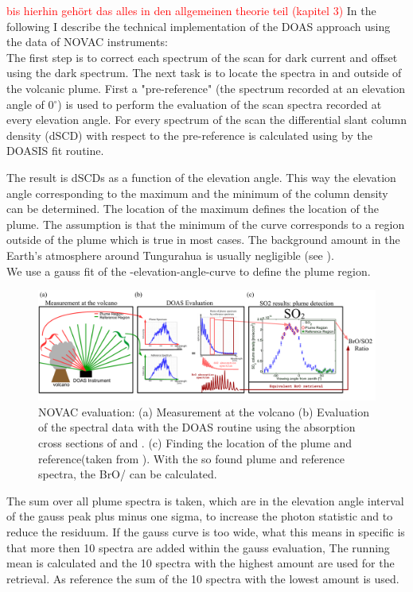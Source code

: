 \textcolor{red}{bis hierhin gehört das alles in den allgemeinen theorie teil (kapitel 3)}
%
In the following I describe the technical implementation of the DOAS approach using the data of NOVAC instruments:\\
%
The first step is to correct each spectrum of the scan for dark current and offset using the dark spectrum.
The next task is to locate the spectra in and outside of the volcanic plume.
First a "pre-reference" (the spectrum recorded at an elevation angle of  0$^{\circ} $) is used to perform the evaluation of the scan spectra recorded at every elevation angle.
For every spectrum of the scan the  differential slant column density (dSCD) with respect to the pre-reference is calculated using  by the DOASIS fit routine.

The result is  dSCDs as a function of the elevation angle. This way the elevation angle corresponding to the maximum and the minimum of the  column density can be determined. The location of the  maximum defines the location of the plume. The assumption is that the minimum of the  curve corresponds to a region outside of the plume which is true in most cases. The background  amount in the Earth's atmosphere around Tungurahua is usually negligible (see  ). \\
We use a gauss fit of the -elevation-angle-curve to define the plume region.
%
\begin{figure}
	\centering
	\includegraphics[width=1\linewidth]{Bilder/NOVAC_Eval}
	\caption{NOVAC evaluation: (a) Measurement at the volcano (b) Evaluation of the spectral data with the DOAS routine using the absorption cross sections of   and . (c) Finding the location of the plume and reference(taken from \cite{WarnachSimon}). With the so found plume and reference spectra, the BrO/ can be calculated. }
	\label{fig:NOVAC_Eval}
\end{figure}
The sum over all plume spectra is taken, which are in the elevation angle interval of the gauss peak plus minus one sigma, to increase the photon statistic and to reduce the residuum. If the gauss curve is too wide, what this means in specific is that more then 10 spectra are added within the gauss evaluation, The running mean is calculated and the 10 spectra with the highest  amount are used for the retrieval. As reference the sum of the 10 spectra with the lowest  amount is used.\\
